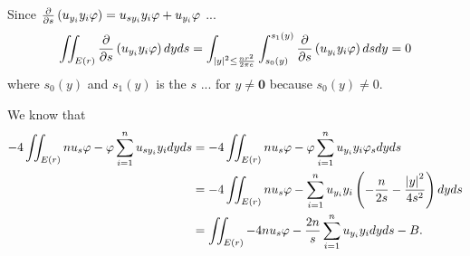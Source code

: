 \documentclass{article}
\begin{document}
Since $\pdv{s}\left(u_{y_i}y_i\varphi\right)=u_{sy_i}y_i\varphi+u_{y_i}\varphi$ ...
\begin{equation*}
\iint_{E(r)}\pdv{s}\left(u_{y_i}y_i\varphi\right)dyds=\int_{\abs{y}^2\leq\frac{nr^2}{2\pi e}}\int_{s_0(y)}^{s_1(y)}\pdv{s}\left(u_{y_i}y_i\varphi\right)dsdy=0
\end{equation*}
where $s_0(y)$ and $s_1(y)$ is the $s$ ... for $y\neq \bm{0}$ because $s_0(y)\neq 0$.

We know that
\begin{equation*}
\begin{split}
-4\iint_{E(r)} nu_s\varphi - \varphi\sum\limits_{i=1}^n u_{sy_i} y_i  dyds &= -4\iint_{E(r)} nu_s\varphi - \varphi\sum\limits_{i=1}^n u_{y_i} y_i \varphi_s dyds \\
&=-4\iint_{E(r)} nu_s\varphi - \sum\limits_{i=1}^n u_{y_i} y_i \left(-\frac{n}{2s}-\frac{\abs{y}^2}{4s^2}\right) dyds \\
&=\iint_{E(r)} -4nu_s\varphi - \frac{2n}{s}\sum\limits_{i=1}^n u_{y_i} y_i dyds - B.
\end{split}
\end{equation*}
\end{document}
